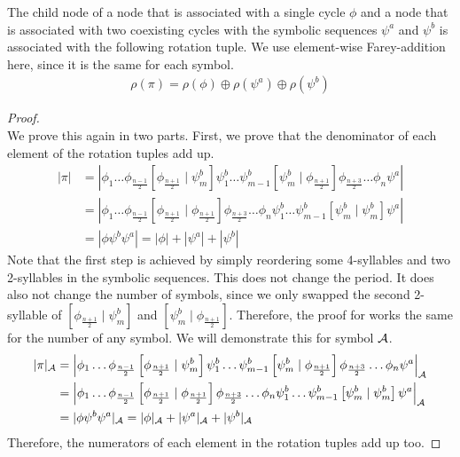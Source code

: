 \begin{theorem}
	The child node of a node that is associated with a single cycle $\phi$ and a node that is associated with two coexisting cycles with the symbolic sequences $\psi^a$ and $\psi^b$ is associated with the following rotation tuple.
	We use element-wise Farey-addition here, since it is the same for each symbol.
	\begin{align}
		\rho(\pi) = \rho(\phi) \oplus \rho(\psi^a) \oplus \rho(\psi^b)
	\end{align}
\end{theorem}

\begin{proof} \phantom{x} \\
	We prove this again in two parts.
	First, we prove that the denominator of each element of the rotation tuples add up.
	\begin{align*}
		|\pi| & = \left|
		\phi_1 \dots \phi_{\frac{n-1}{2}} \left[\phi_{\frac{n+1}{2}} \mid \psi^b_m\right]
		\psi^b_1 \dots \psi^b_{m-1} \left[\psi^b_m \mid \phi_{\frac{n+1}{2}}\right]
		\phi_{\frac{n+3}{2}} \dots \phi_n \psi^a
		\right|                                                       \\
		      & = \left|
		\phi_1 \dots \phi_{\frac{n-1}{2}} \left[\phi_{\frac{n+1}{2}} \mid \phi_{\frac{n+1}{2}}\right]
		\phi_{\frac{n+3}{2}} \dots \phi_n
		\psi^b_1 \dots \psi^b_{m-1} \left[\psi^b_m \mid \psi^b_m\right]
		\psi^a
		\right|                                                       \\
		      & = |\phi \psi^b \psi^a| = |\phi| + |\psi^a| + |\psi^b|
	\end{align*}
	Note that the first step is achieved by simply reordering some 4-syllables and two 2-syllables in the symbolic sequences.
	This does not change the period.
	It does also not change the number of symbols, since we only swapped the second 2-syllable of $\left[\phi_{\frac{n+1}{2}} \mid \psi^b_m\right]$ and $\left[\psi^b_m \mid \phi_{\frac{n+1}{2}}\right]$.
	Therefore, the proof for works the same for the number of any symbol.
	We will demonstrate this for symbol $\mathcal{A}$.
	\begin{align*}
		|\pi|_{\mathcal{A}} & = \left|
		\phi_1 \dots \phi_{\frac{n-1}{2}} \left[\phi_{\frac{n+1}{2}} \mid \psi^b_m\right]
		\psi^b_1 \dots \psi^b_{m-1} \left[\psi^b_m \mid \phi_{\frac{n+1}{2}}\right]
		\phi_{\frac{n+3}{2}} \dots \phi_n \psi^a
		\right|_{\mathcal{A}}                                                                   \\
		         & = \left|
		\phi_1 \dots \phi_{\frac{n-1}{2}} \left[\phi_{\frac{n+1}{2}} \mid \phi_{\frac{n+1}{2}}\right]
		\phi_{\frac{n+3}{2}} \dots \phi_n
		\psi^b_1 \dots \psi^b_{m-1} \left[\psi^b_m \mid \psi^b_m\right]
		\psi^a
		\right|_{\mathcal{A}}                                                                   \\
		         & = |\phi \psi^b \psi^a|_{\mathcal{A}} = |\phi|_{\mathcal{A}} + |\psi^a|_{\mathcal{A}} + |\psi^b|_{\mathcal{A}}
	\end{align*}
	Therefore, the numerators of each element in the rotation tuples add up too.


\end{proof}
